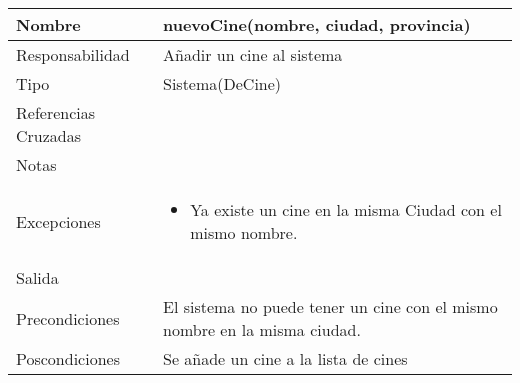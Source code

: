 \documentclass{article}
\begin{document}
\begin{table}[h]
\begin{tabular}{|l|l|l|l|l|l|}
\hline
\multicolumn{2}{|p{3cm}|}{Nombre} & \multicolumn{4}{p{10cm}|}{\textbf{nuevoCine(nombre, ciudad, provincia)}}\\
\hline
\multicolumn{2}{|p{3cm}|}{Responsabilidad} & \multicolumn{4}{p{10cm}|}{Añadir un cine al sistema} \\
\hline
\multicolumn{2}{|p{3cm}|}{Tipo} & \multicolumn{4}{p{10cm}|}{Sistema(DeCine)} \\
\hline
\multicolumn{2}{|p{3cm}|}{Referencias Cruzadas} & \multicolumn{4}{p{10cm}|}{} \\
\hline
\multicolumn{2}{|p{3cm}|}{Notas} & \multicolumn{4}{p{10cm}|}{} \\
\hline
\multicolumn{2}{|p{3cm}|}{Excepciones} & \multicolumn{4}{p{10cm}|}{\begin{itemize}
\item Ya existe un cine en la misma Ciudad con el mismo nombre.
\end{itemize}} \\
\hline
\multicolumn{2}{|p{3cm}|}{Salida} & \multicolumn{4}{p{10cm}|}{} \\
\hline
\multicolumn{2}{|p{3cm}|}{Precondiciones} & \multicolumn{4}{p{10cm}|}{El sistema no puede tener un cine con el mismo nombre en la misma ciudad.} \\
\hline
\multicolumn{2}{|p{3cm}|}{Poscondiciones} & \multicolumn{4}{p{10cm}|}{Se añade un cine a la lista de cines} \\
\hline
\end{tabular}
\end{table}
\end{document}
